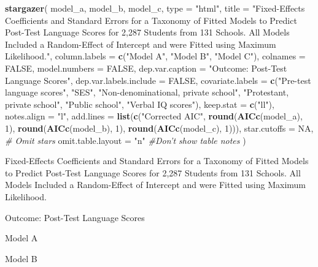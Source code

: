\documentclass[]{book}
\newenvironment{Shaded}{\begin{snugshade}}{\end{snugshade}}
\newcommand{\CommentTok}[1]{\textcolor[rgb]{0.56,0.35,0.01}{\textit{#1}}}
\newcommand{\DataTypeTok}[1]{\textcolor[rgb]{0.13,0.29,0.53}{#1}}
\newcommand{\DecValTok}[1]{\textcolor[rgb]{0.00,0.00,0.81}{#1}}
\newcommand{\KeywordTok}[1]{\textcolor[rgb]{0.13,0.29,0.53}{\textbf{#1}}}
\newcommand{\NormalTok}[1]{#1}
\newcommand{\OtherTok}[1]{\textcolor[rgb]{0.56,0.35,0.01}{#1}}
\newcommand{\StringTok}[1]{\textcolor[rgb]{0.31,0.60,0.02}{#1}}
\begin{document}
\begin{Shaded}
\begin{Highlighting}[]
\KeywordTok{stargazer}\NormalTok{(}
\NormalTok{  model_a, model_b, model_c,}
  \DataTypeTok{type =} \StringTok{"html"}\NormalTok{,}
  \DataTypeTok{title =} \StringTok{"Fixed-Effects Coefficients and Standard Errors for a Taxonomy of Fitted Models to Predict Post-Test Language Scores for 2,287 Students from 131 Schools. All Models Included a Random-Effect of Intercept and were Fitted using Maximum Likelihood."}\NormalTok{,}
  \DataTypeTok{column.labels =} \KeywordTok{c}\NormalTok{(}\StringTok{"Model A"}\NormalTok{, }\StringTok{"Model B"}\NormalTok{, }\StringTok{"Model C"}\NormalTok{),}
  \DataTypeTok{colnames =} \OtherTok{FALSE}\NormalTok{,}
  \DataTypeTok{model.numbers =} \OtherTok{FALSE}\NormalTok{,}
  \DataTypeTok{dep.var.caption =} \StringTok{"Outcome: Post-Test Language Scores"}\NormalTok{,}
  \DataTypeTok{dep.var.labels.include =} \OtherTok{FALSE}\NormalTok{,}
  \DataTypeTok{covariate.labels =} \KeywordTok{c}\NormalTok{(}\StringTok{"Pre-test language scores"}\NormalTok{, }\StringTok{"SES"}\NormalTok{, }\StringTok{"Non-denominational, private school"}\NormalTok{, }
                       \StringTok{"Protestant, private school"}\NormalTok{, }\StringTok{"Public school"}\NormalTok{, }\StringTok{"Verbal IQ scores"}\NormalTok{),}
  \DataTypeTok{keep.stat =} \KeywordTok{c}\NormalTok{(}\StringTok{"ll"}\NormalTok{),}
  \DataTypeTok{notes.align =} \StringTok{"l"}\NormalTok{,}
  \DataTypeTok{add.lines =} \KeywordTok{list}\NormalTok{(}\KeywordTok{c}\NormalTok{(}\StringTok{"Corrected AIC"}\NormalTok{, }\KeywordTok{round}\NormalTok{(}\KeywordTok{AICc}\NormalTok{(model_a), }\DecValTok{1}\NormalTok{), }\KeywordTok{round}\NormalTok{(}\KeywordTok{AICc}\NormalTok{(model_b), }\DecValTok{1}\NormalTok{), }
                     \KeywordTok{round}\NormalTok{(}\KeywordTok{AICc}\NormalTok{(model_c), }\DecValTok{1}\NormalTok{))),}
  \DataTypeTok{star.cutoffs =} \OtherTok{NA}\NormalTok{, }\CommentTok{# Omit stars}
  \DataTypeTok{omit.table.layout =} \StringTok{"n"} \CommentTok{#Don't show table notes}
\NormalTok{  )}
\end{Highlighting}
\end{Shaded}

Fixed-Effects Coefficients and Standard Errors for a Taxonomy of Fitted Models to Predict Post-Test Language Scores for 2,287 Students from 131 Schools. All Models Included a Random-Effect of Intercept and were Fitted using Maximum Likelihood.

Outcome: Post-Test Language Scores

Model A

Model B
\end{document}
